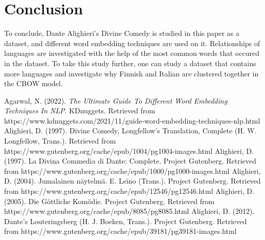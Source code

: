 \documentclass[man]{apa7}
\begin{document}
\section{Conclusion}
To conclude, Dante Alighieri's Divine Comedy is studied in this paper as a dataset, and different word embedding techniques are used on it. Relationships of languages are investigated with the help of the most common words that occured in the dataset. To take this study further, one can study a dataset that contains more languages and investigate why Finnish and Italian are clustered together in the CBOW model.
\newpage
\begin{thebibliography}{7}
Agarwal, N. (2022). \emph{The Ultimate Guide To Different Word Embedding Techniques In NLP}. KDnuggets. Retrieved from https://www.kdnuggets.com/2021/11/guide-word-embedding-techniques-nlp.html
Alighieri, D. (1997). Divine Comedy, Longfellow's Translation, Complete (H. W. Longfellow, Trans.). Retrieved from https://www.gutenberg.org/cache/epub/1004/pg1004-images.html
Alighieri, D. (1997). La Divina Commedia di Dante: Complete. Project Gutenberg. Retrieved from https://www.gutenberg.org/cache/epub/1000/pg1000-images.html
Alighieri, D. (2004). Jumalainen näytelmä. E. Leino (Trans.). Project Gutenberg. Retrieved from https://www.gutenberg.org/cache/epub/12546/pg12546.html
Alighieri, D. (2005). Die Göttliche Komödie. Project Gutenberg. Retrieved from https://www.gutenberg.org/cache/epub/8085/pg8085.html
Alighieri, D. (2012). Dante's Louteringsberg (H. J. Boeken, Trans.). Project Gutenberg. Retrieved from https://www.gutenberg.org/cache/epub/39181/pg39181-images.html





\end{thebibliography}
\end{document}
